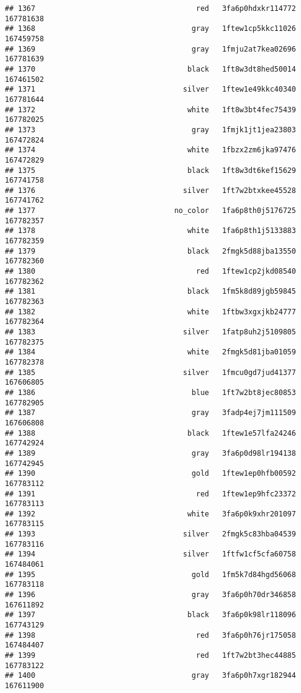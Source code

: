 \documentclass[
]{article}
\begin{document}
\begin{verbatim}
## 1367                                     red   3fa6p0hdxkr114772 167781638
## 1368                                    gray   1ftew1cp5kkc11026 167459758
## 1369                                    gray   1fmju2at7kea02696 167781639
## 1370                                   black   1ft8w3dt8hed50014 167461502
## 1371                                  silver   1ftew1e49kkc40340 167781644
## 1372                                   white   1ft8w3bt4fec75439 167782025
## 1373                                    gray   1fmjk1jt1jea23803 167472824
## 1374                                   white   1fbzx2zm6jka97476 167472829
## 1375                                   black   1ft8w3dt6kef15629 167741758
## 1376                                  silver   1ft7w2btxkee45528 167741762
## 1377                                no_color   1fa6p8th0j5176725 167782357
## 1378                                   white   1fa6p8th1j5133883 167782359
## 1379                                   black   2fmgk5d88jba13550 167782360
## 1380                                     red   1ftew1cp2jkd08540 167782362
## 1381                                   black   1fm5k8d89jgb59845 167782363
## 1382                                   white   1ftbw3xgxjkb24777 167782364
## 1383                                  silver   1fatp8uh2j5109805 167782375
## 1384                                   white   2fmgk5d81jba01059 167782378
## 1385                                  silver   1fmcu0gd7jud41377 167606805
## 1386                                    blue   1ft7w2bt8jec80853 167782905
## 1387                                    gray   3fadp4ej7jm111509 167606808
## 1388                                   black   1ftew1e57lfa24246 167742924
## 1389                                    gray   3fa6p0d98lr194138 167742945
## 1390                                    gold   1ftew1ep0hfb00592 167783112
## 1391                                     red   1ftew1ep9hfc23372 167783113
## 1392                                   white   3fa6p0k9xhr201097 167783115
## 1393                                  silver   2fmgk5c83hba04539 167783116
## 1394                                  silver   1ftfw1cf5cfa60758 167484061
## 1395                                    gold   1fm5k7d84hgd56068 167783118
## 1396                                    gray   3fa6p0h70dr346858 167611892
## 1397                                   black   3fa6p0k98lr118096 167743129
## 1398                                     red   3fa6p0h76jr175058 167484407
## 1399                                     red   1ft7w2bt3hec44885 167783122
## 1400                                    gray   3fa6p0h7xgr182944 167611900

\end{verbatim}
\end{document}

